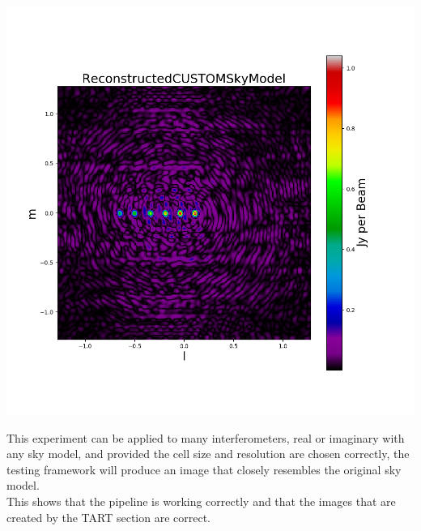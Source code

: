\begin{center}
    \includegraphics[scale=0.35]{images/ReconstructedCUSTOMSkyModel.png}
\end{center}
This experiment can be applied to many interferometers, real or imaginary with any sky model, and provided the cell size and resolution are chosen correctly, the testing framework will produce an image that closely resembles the original sky model.\\
This shows that the pipeline is working correctly and that the images that are created by the TART section are correct.
